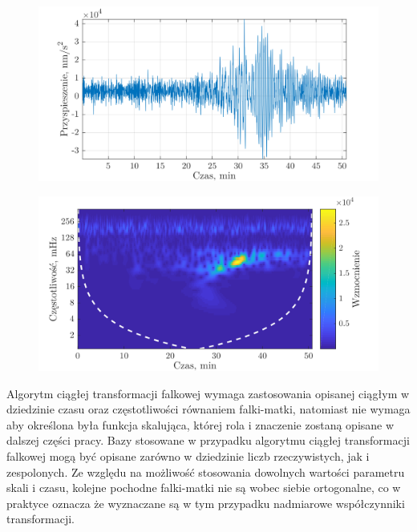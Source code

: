 \begin{figure}[htb!]
\begin{center}
\includegraphics{obrazki/cobe_time}
\end{center}
\end{figure}

\begin{figure}[htb!]
\begin{center}
\includegraphics{obrazki/cobe_cwt}
\end{center}
\end{figure}

Algorytm ciągłej transformacji falkowej wymaga zastosowania opisanej ciągłym w dziedzinie czasu oraz częstotliwości równaniem falki-matki, natomiast nie wymaga aby określona była funkcja skalująca, której rola i znaczenie zostaną opisane w dalszej części pracy. Bazy stosowane w przypadku algorytmu ciągłej transformacji falkowej mogą być opisane zarówno w dziedzinie liczb rzeczywistych, jak i zespolonych. Ze względu na możliwość stosowania dowolnych wartości parametru skali i czasu, kolejne pochodne falki-matki nie są wobec siebie ortogonalne, co w praktyce oznacza że wyznaczane są w tym przypadku nadmiarowe współczynniki transformacji.

